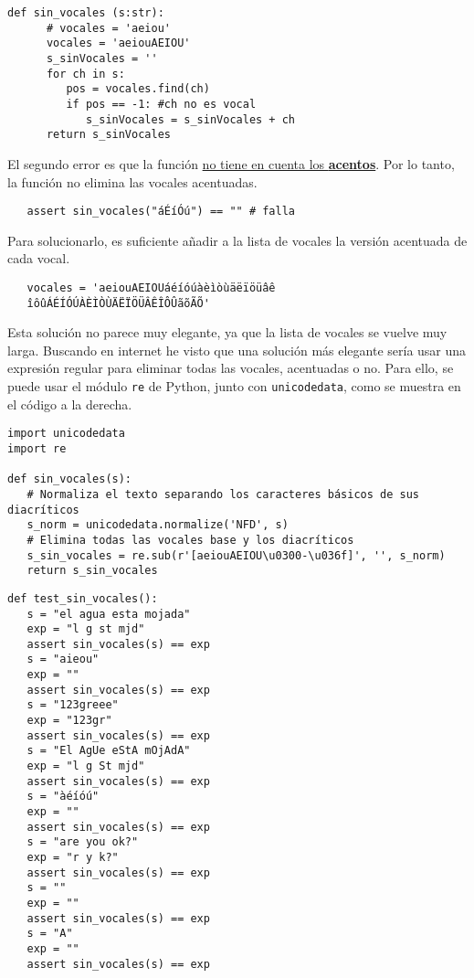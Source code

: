 \begin{lstlisting}[captionpos=b,caption={\lstinline|sin_vocales()| con vocales mayúsculas}, label={code:sin_vocales1}]
   def sin_vocales (s:str):
      # vocales = 'aeiou'
      vocales = 'aeiouAEIOU'
      s_sinVocales = ''
      for ch in s:
         pos = vocales.find(ch)
         if pos == -1: #ch no es vocal
            s_sinVocales = s_sinVocales + ch
      return s_sinVocales
\end{lstlisting}

\newpage
\begin{paracol}{2}
   \colfill
   El segundo error es que la función \ul{no tiene en cuenta los \textbf{acentos}}. Por lo tanto, la función no elimina las vocales acentuadas.
   \begin{lstlisting}
   assert sin_vocales("áÉíÓú") == "" # falla
   \end{lstlisting}
   Para solucionarlo, es suficiente añadir a la lista de vocales la versión acentuada de cada vocal.

   \begin{lstlisting}
   vocales = 'aeiouAEIOUáéíóúàèìòùäëïöüâê
   îôûÁÉÍÓÚÀÈÌÒÙÄËÏÖÜÂÊÎÔÛãõÃÕ'
   \end{lstlisting}

   Esta solución no parece muy elegante, ya que la lista de vocales se vuelve muy larga. Buscando en internet he visto que una solución más elegante sería usar una expresión regular para eliminar todas las vocales, acentuadas o no. Para ello, se puede usar el módulo \lstinline{re} de Python, junto con \lstinline{unicodedata}, como se muestra en el código a la derecha.
   \colfill

   \switchcolumn
   \colfill
   \begin{lstlisting}[label={code:unicodedata},captionpos=b,caption={Código para eliminar vocales y diacríticos que utiliza \lstinline{unicodedata}}]
import unicodedata
import re

def sin_vocales(s):
   # Normaliza el texto separando los caracteres básicos de sus diacríticos
   s_norm = unicodedata.normalize('NFD', s)
   # Elimina todas las vocales base y los diacríticos
   s_sin_vocales = re.sub(r'[aeiouAEIOU\u0300-\u036f]', '', s_norm)
   return s_sin_vocales
   \end{lstlisting}
   \colfill
\end{paracol}

\vspace{2em}

\begin{lstlisting}[captionpos=b,caption={Pruebas que he escrito}, label={code:pruebas}]
def test_sin_vocales():
   s = "el agua esta mojada"
   exp = "l g st mjd"
   assert sin_vocales(s) == exp
   s = "aieou"
   exp = ""
   assert sin_vocales(s) == exp
   s = "123greee"
   exp = "123gr"
   assert sin_vocales(s) == exp
   s = "El AgUe eStA mOjAdA"
   exp = "l g St mjd"
   assert sin_vocales(s) == exp
   s = "àéíóú"
   exp = ""
   assert sin_vocales(s) == exp
   s = "are you ok?"
   exp = "r y k?"
   assert sin_vocales(s) == exp
   s = ""
   exp = ""
   assert sin_vocales(s) == exp
   s = "A"
   exp = ""
   assert sin_vocales(s) == exp
   
\end{lstlisting}

